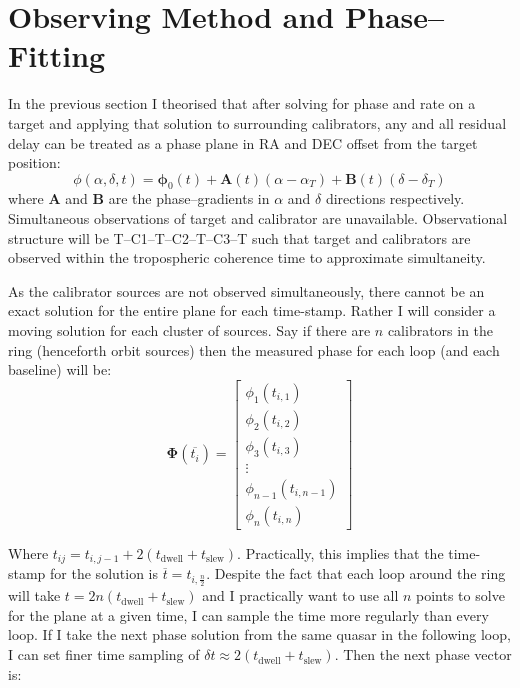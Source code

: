 \section{Observing Method and Phase--Fitting} \label{sec:multiviewfitting}
	In the previous section I theorised that after solving for phase and rate on a target and applying that solution to surrounding calibrators, any and all residual delay can be treated as a phase plane in RA and DEC offset from the target position:
	\begin{equation}
	\phi\left(\alpha,\delta,t\right)=\boldsymbol{\phi}_0\left(t\right)+\textbf{A}\left(t\right)\left(\alpha-\alpha_T\right)+\textbf{B}\left(t\right)\left(\delta-\delta_T\right)
	\end{equation} where $\textbf{A}$ and $\textbf{B}$ are the phase--gradients in $\alpha$ and $\delta$ directions respectively. Simultaneous observations of target and calibrator are unavailable. Observational structure will be T--C1--T--C2--T--C3--T such that target and calibrators are observed within the tropospheric coherence time to approximate simultaneity.
	
	As the calibrator sources are not observed simultaneously, there cannot be an exact solution for the entire plane for each time-stamp. Rather I will consider a moving solution for each cluster of sources. Say if there are $n$ calibrators in the ring (henceforth orbit sources) then the measured phase for each loop (and each baseline) will be:	
	\[\boldsymbol{\Phi}\left(\overline{t_i}\right) =
	\begin{bmatrix}
	\phi_1(t_{i,1}) \\
	\phi_2(t_{i,2}) \\
	\phi_3(t_{i,3}) \\
	\vdots \\
	\phi_{n-1}(t_{i,n-1}) 	\\
	\phi_n(t_{i,n}) 	    
	\end{bmatrix}
	\]
	
	Where $t_{ij}=t_{i,j-1}+2\left(t_{\text{dwell}}+t_{\text{slew}}\right)$. Practically, this implies that the time-stamp for the solution is $\overline{t} = t_{i,\frac{n}{2}}$. Despite the fact that each loop around the ring will take $t=2n\left(t_{\text{dwell}}+t_{\text{slew}}\right)$ and I practically want to use all $n$ points to solve for the plane at a given time, I can sample the time more regularly than every loop. If I take the next phase solution from the same quasar in the following loop, I can set finer time sampling of $\delta t \approx 2\left(t_{\text{dwell}}+t_{\text{slew}}\right) $. Then the next phase vector is:
	
